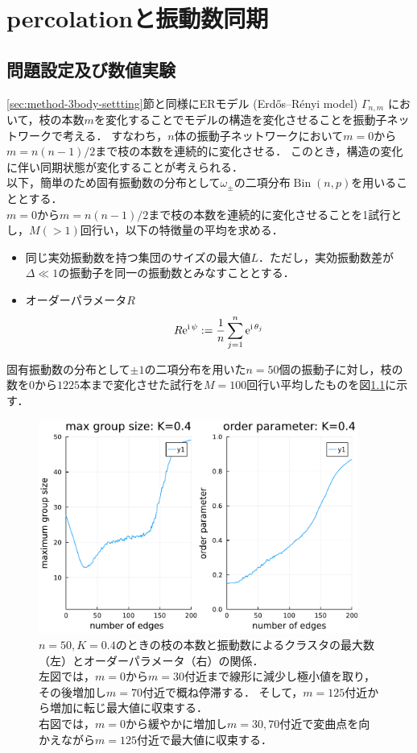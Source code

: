 \documentclass[../main]{subfiles}
\begin{document}
\chapter{percolationと振動数同期}
\label{chap:percolation}
\section{問題設定及び数値実験}
\ref{sec:method-3body-settting}節と同様にERモデル (Erdős–Rényi model) $\Gamma_{n,m}$ において，枝の本数$m$を変化することでモデルの構造を変化させることを振動子ネットワークで考える．
すなわち，$n$体の振動子ネットワークにおいて$m=0$から$m=n(n-1)/2$まで枝の本数を連続的に変化させる．
このとき，構造の変化に伴い同期状態が変化することが考えられる．\\
以下，簡単のため固有振動数の分布として$\omega_\pm$の二項分布$\operatorname{Bin}(n,p)$を用いることとする．\\
$m=0$から$m=n(n-1)/2$まで枝の本数を連続的に変化させることを1試行とし，$M(>1)$回行い，以下の特徴量の平均を求める．
\begin{itemize}
    \item 
    同じ実効振動数を持つ集団のサイズの最大値$L$．ただし，実効振動数差が$\Delta\ll 1$の振動子を同一の振動数とみなすこととする．
    \item
    オーダーパラメータ$R$
    \begin{align*}
        R\mathrm{e}^{{\mathrm i\,} \psi}:=\frac{1}{n}\sum_{j=1}^n\mathrm{e}^{{\mathrm i\,} \theta_j}    
    \end{align*}
\end{itemize}
固有振動数の分布として$\pm 1$の二項分布を用いた$n=50$個の振動子に対し，枝の数を$0$から$1225$本まで変化させた試行を$M=100$回行い平均したものを図\ref{fig:edge-strict400}に示す．
\begin{figure}[H]
\centering
\includegraphics[width=105mm]{images/edge-finite-strict400.pdf}
\centering
\caption{$n=50,K=0.4$のときの枝の本数と振動数によるクラスタの最大数（左）とオーダーパラメータ（右）の関係．\\
左図では，$m=0$から$m=30$付近まで線形に減少し極小値を取り，その後増加し$m=70$付近で概ね停滞する．
そして，$m=125$付近から増加に転じ最大値に収束する．\\
右図では，$m=0$から緩やかに増加し$m=30,70$付近で変曲点を向かえながら$m=125$付近で最大値に収束する．
}
\label{fig:edge-strict400}
\end{figure}
\end{document}
